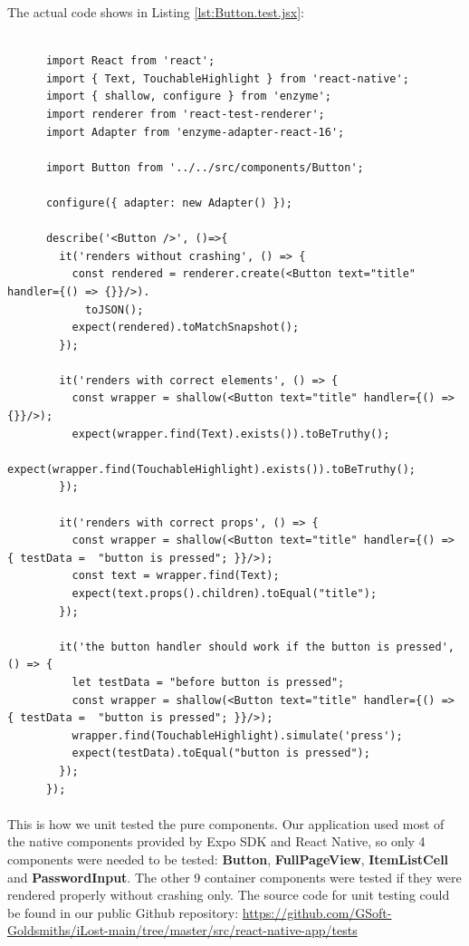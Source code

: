 \documentclass[12pt,a4paper]{article}
\begin{document}
          The actual code shows in Listing \ref{lst:Button.test.jsx}:
          \begin{lstlisting}[caption=Button.test.jsx, label={lst:Button.test.jsx}]
      
      import React from 'react';
      import { Text, TouchableHighlight } from 'react-native';
      import { shallow, configure } from 'enzyme';
      import renderer from 'react-test-renderer';
      import Adapter from 'enzyme-adapter-react-16';

      import Button from '../../src/components/Button';

      configure({ adapter: new Adapter() });

      describe('<Button />', ()=>{
        it('renders without crashing', () => {
          const rendered = renderer.create(<Button text="title" handler={() => {}}/>).
            toJSON();
          expect(rendered).toMatchSnapshot();
        });
        
        it('renders with correct elements', () => {
          const wrapper = shallow(<Button text="title" handler={() => {}}/>);
          expect(wrapper.find(Text).exists()).toBeTruthy();
          expect(wrapper.find(TouchableHighlight).exists()).toBeTruthy();
        });

        it('renders with correct props', () => {
          const wrapper = shallow(<Button text="title" handler={() => { testData =  "button is pressed"; }}/>);
          const text = wrapper.find(Text);
          expect(text.props().children).toEqual("title");
        });

        it('the button handler should work if the button is pressed', () => {
          let testData = "before button is pressed";
          const wrapper = shallow(<Button text="title" handler={() => { testData =  "button is pressed"; }}/>);
          wrapper.find(TouchableHighlight).simulate('press');
          expect(testData).toEqual("button is pressed");
        });
      });

          \end{lstlisting}

          \paragraph{} This is how we unit tested the pure components. Our application used most of the native components provided by Expo SDK and React Native, so only 4 components were needed to be tested: {\bf Button}, {\bf FullPageView}, {\bf ItemListCell} and {\bf PasswordInput}. The other 9 container components were tested if they were rendered properly without crashing only. The source code for unit testing could be found in our public Github repository: \url{https://github.com/GSoft-Goldsmiths/iLost-main/tree/master/src/react-native-app/tests}
\end{document}
